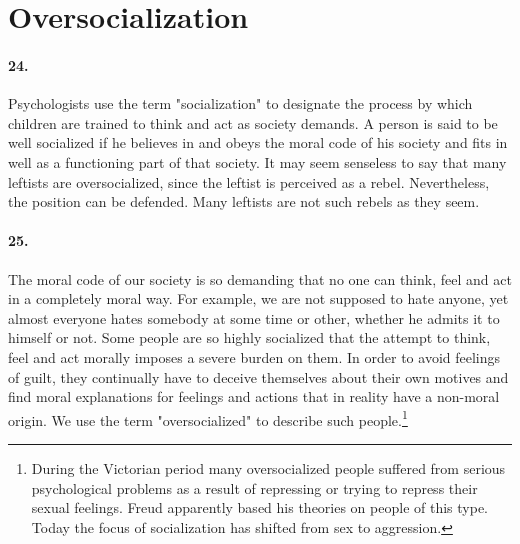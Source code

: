 \documentclass[12pt]{book}
\newcommand{\mysection}[1]{\section*{#1} \addcontentsline{toc}{section}{#1}}
\begin{document}
\mysection{Oversocialization}


\paragraph{24.} Psychologists use the term "socialization" to designate the process by which children are trained to think and act as society demands. A person is said to be well socialized if he believes in and obeys the moral code of his society and fits in well as a functioning part of that society. It may seem senseless to say that many leftists are oversocialized, since the leftist is perceived as a rebel. Nevertheless, the position can be defended. Many leftists are not such rebels as they seem.


\paragraph{25.}  The moral code of our society is so demanding that no one can think, feel and act in a completely moral way. For example, we are not supposed to hate anyone, yet almost everyone hates somebody at some time or other, whether he admits it to himself or not. Some people are so highly socialized that the attempt to think, feel and act morally imposes a severe burden on them. In order to avoid feelings of guilt, they continually have to deceive themselves about their own motives and find moral explanations for feelings and actions that in reality have a non-moral origin. We use the term "oversocialized" to describe such people.\footnote{During the Victorian period many oversocialized people suffered from serious psychological problems as a result of repressing or trying to repress their sexual feelings. Freud apparently based his theories on people of this type. Today the focus of socialization has shifted from sex to aggression.}
\end{document}
